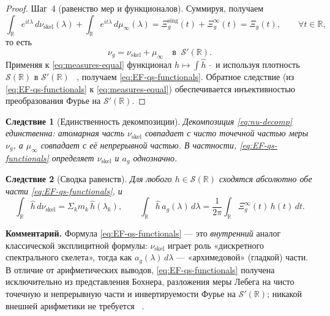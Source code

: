 \documentclass{article}
\numberwithin{equation}{section}
\theoremstyle{plain}
\newtheorem{corollary}{Следствие}
\theoremstyle{definition}
\theoremstyle{remark}
\def\infty{∞}\def\partial{∂}\def\sum{Σ}\def\int{∫}%
\def\cdot{·}\def\times{×}\def\pm{±}\def\mp{∓}\def\approx{≈}%
\begin{document}
\begin{proof}
Шаг~4 (равенство мер и функционалов).
Суммируя, получаем
\begin{equation}
\int_{\mathbb R} e^{it\lambda}\,d\nu_{\mathrm{skel}}(\lambda)
+\int_{\mathbb R} e^{it\lambda}\,d\mu_\infty(\lambda)
=\Xi_g^{\mathrm{sing}}(t)+\Xi_g^{\infty}(t)=\Xi_g(t),\qquad \forall t\in\mathbb R,
\end{equation}
то есть
\begin{equation}
\label{eq:measures-equal}
\nu_g=\nu_{\mathrm{skel}}+\mu_\infty
\quad\text{в }\ \mathcal S'(\mathbb R).
\end{equation}
Применяя к \eqref{eq:measures-equal} функционал $h\mapsto \int \widehat h\,\cdot$
и используя плотность $\mathcal S(\mathbb R)$ в $\mathcal S'(\mathbb R)$ ~\cite{GelfandShilov1968},
получаем \eqref{eq:EF-qs-functionals}.
Обратное следствие (из \eqref{eq:EF-qs-functionals} к \eqref{eq:measures-equal}) обеспечивается инъективностью преобразования Фурье на $\mathcal S'(\mathbb R)$.
\end{proof}

\begin{corollary}[Единственность декомпозиции]
\label{cor:uniqueness}
Декомпозиция \eqref{eq:nu-decomp} единственна: атомарная часть $\nu_{\mathrm{skel}}$ совпадает с чисто точечной частью меры $\nu_g$, а $\mu_\infty$ совпадает с её непрерывной частью. В частности, \eqref{eq:EF-qs-functionals} определяет $\nu_{\mathrm{skel}}$ и $a_g$ однозначно.
\end{corollary}

\begin{corollary}[Сводка равенств]
\label{cor:summary-EF}
Для любого $h\in\mathcal S(\mathbb R)$ сходятся абсолютно обе части \eqref{eq:EF-qs-functionals}, и
\begin{equation}
\int_{\mathbb R}\widehat h\,d\nu_{\mathrm{skel}}
=\sum_k m_k\,\widehat h(\lambda_k),
\qquad
\int_{\mathbb R}\widehat h\,a_g(\lambda)\,d\lambda
=\frac{1}{2\pi}\int_{\mathbb R}\Xi_g^{\infty}(t)\,h(t)\,dt.
\end{equation}
\end{corollary}

\noindent
\textbf{Комментарий.}
Формула \eqref{eq:EF-qs-functionals} — это \emph{внутренний} аналог классической эксплицитной формулы:
$\nu_{\mathrm{skel}}$ играет роль «дискретного спектрального скелета»,
тогда как $a_g(\lambda)\,d\lambda$ — «архимедовой» (гладкой) части.
В отличие от арифметических выводов, \eqref{eq:EF-qs-functionals} получена
исключительно из представления Бохнера, разложения меры Лебега на чисто точечную и непрерывную части
и инвертируемости Фурье на $\mathcal S'(\mathbb R)$;
никакой внешней арифметики не требуется ~\cite{Weil1952}.
\end{document}
